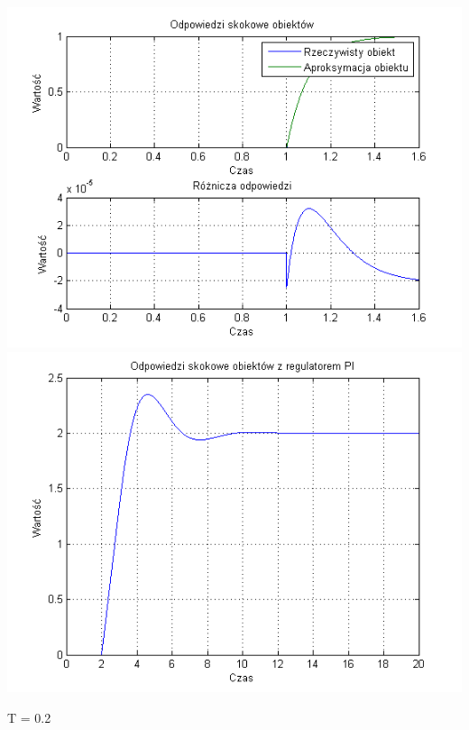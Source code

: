 \documentclass[10pt,a4paper]{article}
\begin{document}
\begin{center}
\includegraphics[scale=1]{images/jeden/skrypt_05.png}\\
\includegraphics[scale=1]{images/jeden/skrypt_06.png}\\
\end{center}
\newpage
T = 0.2
\end{document}
